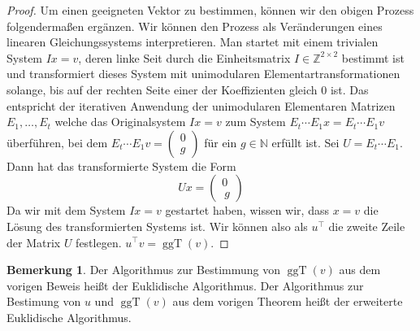 \documentclass[
a4paper,12pt,
bibliography=totocnumbered,
numbers=noenddot,
]{scrartcl}
\numberwithin{equation}{subsection}
\newcommand{\N}{\mathbb N}
\newcommand{\Z}{\mathbb Z}
\newcommand{\ggT}{\operatorname{ggT}} %
\theoremstyle{plain}
\theoremstyle{definition}
\newtheorem*{bem}{Bemerkung}
\begin{document}
\begin{proof}
	Um einen geeigneten Vektor zu bestimmen, können wir den obigen Prozess folgendermaßen ergänzen. Wir können den Prozess als Veränderungen eines linearen Gleichungssystems interpretieren. Man startet mit einem trivialen System $I x = v$, deren linke Seit durch die Einheitsmatrix $I \in \Z^{2 \times 2}$ bestimmt ist und transformiert dieses System mit unimodularen Elementartransformationen solange, bis auf der rechten Seite einer der Koeffizienten gleich $0$ ist. Das entspricht der iterativen Anwendung der unimodularen Elementaren Matrizen $E_1,\ldots,E_t$ welche das Originalsystem $Ix = v$ zum System $E_t \cdots E_1 x = E_t \cdots E_1 v$  überführen, bei dem $E_ t \cdots E_1 v = \begin{pmatrix} 0 \\ g \end{pmatrix}$ für ein $g \in \N$ erfüllt ist. Sei $U = E_t \cdots E_1$. Dann hat das transformierte System die Form 
	\[
			U x = \begin{pmatrix} 0 \\\ g  \end{pmatrix} 
	\]
Da wir mit dem System $I x = v$ gestartet haben, wissen wir, dass $x=v$ die Lösung des transformierten Systems ist. Wir können also als $u^\top$ die zweite Zeile der Matrix $U$ festlegen. 
$u^\top v = \ggT(v)$. 
\end{proof} 

\begin{bem} 
Der Algorithmus zur Bestimmung von $\ggT(v)$ aus dem vorigen Beweis heißt der Euklidische Algorithmus. Der Algorithmus zur Bestimung von $u$ und $\ggT(v)$ aus dem vorigen Theorem heißt der erweiterte Euklidische Algorithmus. 
\end{bem} 
\end{document}
